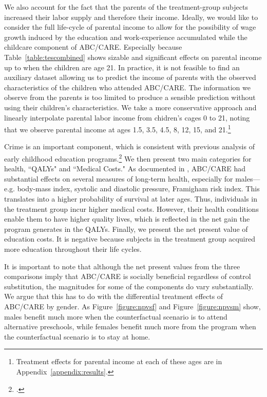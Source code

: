 We also account for the fact that the parents of the treatment-group subjects increased their labor supply and therefore their income. Ideally, we would like to consider the full life-cycle of parental income to allow for the possibility of wage growth induced by the education and work-experience accumulated while the childcare component of ABC/CARE. Especially because Table~\ref{table:tescombined} shows sizable and significant effects on parental income up to when the children are age 21. In practice, it is not feasible to find an auxiliary dataset allowing us to predict the income of parents with the observed characteristics of the children who attended ABC/CARE. The information we observe from the parents is too limited to produce a sensible prediction without using their children's characteristics. We take a more conservative approach and linearly interpolate parental labor income from chidren's cages 0 to 21, noting that we observe parental income at ages 1.5, 3.5, 4.5, 8, 12, 15, and 21.\footnote{Treatment effects for parental income at each of these ages are in Appendix~\ref{appendix:results}.}

Crime is an important component, which is consistent with previous analysis of early childhood education programs.\footnote{\citet{Heckman_Moon_etal_2010_RateofReturn}.} We then present two main categories for health, ``QALYs" and ``Medical Costs." As documented in \citet{Campbell_Conti_etal_2014_EarlyChildhoodInvestments}, ABC/CARE had substantial effects on several measures of long-term health, especially for males---e.g. body-mass index, systolic and diastolic pressure, Framigham risk index. This translates into a higher probability of survival at later ages. Thus, individuals in the treatment group incur higher medical costs. However, their health conditions enable them to have higher quality lives, which is reflected in the net gain the program generates in the QALYs. Finally, we present the net present value of education costs. It is negative because subjects in the treatment group acquired more education throughout their life cycles.

It is important to note that although the net present values from the three comparisons imply that ABC/CARE is socially beneficial regardless of control substitution, the magnitudes for some of the components do vary substantially. We argue that this has to do with the differential treatment effects of ABC/CARE by gender. As Figure~\ref{figure:npvsf} and Figure~\ref{figure:npvsm} show, males benefit much more when the counterfactual scenario is to attend alternative preschools, while females benefit much more from the program when the counterfactual scenario is to stay at home.


